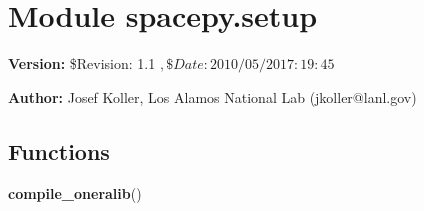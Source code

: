 %
%
%


\section{Module spacepy.setup}

    \label{spacepy:setup}
\textbf{Version:} \$Revision: 1.1 $, \$Date: 2010/05/20 17:19:45 $



\textbf{Author:} Josef Koller, Los Alamos National Lab (jkoller@lanl.gov)





  \subsection{Functions}

    \label{spacepy:setup:compile_oneralib}

    \vspace{0.5ex}

\hspace{.8\funcindent}\begin{boxedminipage}{\funcwidth}

    \raggedright \textbf{compile\_oneralib}()

\setlength{\parskip}{2ex}
\setlength{\parskip}{1ex}
    \end{boxedminipage}

    \label{spacepy:setup:subst}

    \vspace{0.5ex}

